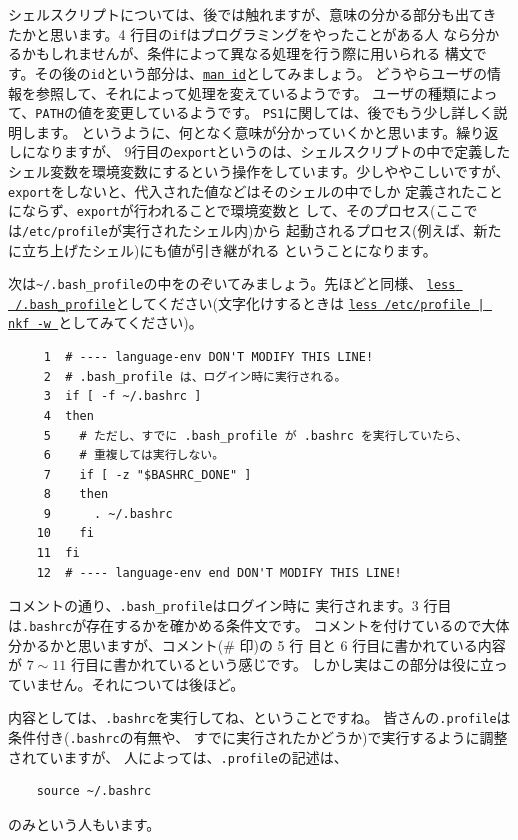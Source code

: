 \documentclass[a4j]{ltjsreport}
\begin{document}
    シェルスクリプトについては、後では触れますが、意味の分かる部分も出てき
    たかと思います。4 行目の\verb+if+はプログラミングをやったことがある人
    なら分かるかもしれませんが、条件によって異なる処理を行う際に用いられる
    構文です。その後の\verb+id+という部分は、\underline{\texttt{man id}}としてみましょう。
    どうやらユーザの情報を参照して、それによって処理を変えているようです。
    ユーザの種類によって、\verb+PATH+の値を変更しているようです。
    \verb+PS1+に関しては、後でもう少し詳しく説明します。
    というように、何となく意味が分かっていくかと思います。繰り返しになりますが、
    9行目の\verb+export+というのは、シェルスクリプトの中で定義した
    シェル変数を環境変数にするという操作をしています。少しややこしいですが、
    \verb+export+をしないと、代入された値などはそのシェルの中でしか
    定義されたことにならず、\verb+export+が行われることで環境変数と
    して、そのプロセス(ここでは\verb+/etc/profile+が実行されたシェル内)から
    起動されるプロセス(例えば、新たに立ち上げたシェル)にも値が引き継がれる
    ということになります。

    \vspace*{3mm}

    次は\verb+~/.bash_profile+の中をのぞいてみましょう。先ほどと同様、
    \underline{\texttt{less ~/.bash\_profile}}としてください(文字化けするときは
    \underline{\texttt{less /etc/profile | nkf -w }}としてみてください)。

    \begin{verbatim}
     1  # ---- language-env DON'T MODIFY THIS LINE!
     2  # .bash_profile は、ログイン時に実行される。
     3  if [ -f ~/.bashrc ]
     4  then
     5    # ただし、すでに .bash_profile が .bashrc を実行していたら、
     6    # 重複しては実行しない。
     7    if [ -z "$BASHRC_DONE" ]
     8    then
     9      . ~/.bashrc
    10    fi
    11  fi
    12  # ---- language-env end DON'T MODIFY THIS LINE!
    \end{verbatim}

    コメントの通り、\verb+.bash_profile+はログイン時に
    実行されます。3 行目は\verb+.bashrc+が存在するかを確かめる条件文です。
    コメントを付けているので大体分かるかと思いますが、コメント(\# 印)の 5 行
    目と 6 行目に書かれている内容が $7 \sim 11$ 行目に書かれているという感じです。
    しかし実はこの部分は役に立っていません。それについては後ほど。

    内容としては、\verb+.bashrc+を実行してね、ということですね。
    皆さんの\verb+.profile+は条件付き(\verb+.bashrc+の有無や、
    すでに実行されたかどうか)で実行するように調整されていますが、
    人によっては、\verb+.profile+の記述は、
    \begin{verbatim}
    source ~/.bashrc
    \end{verbatim}
    のみという人もいます。
\end{document}
